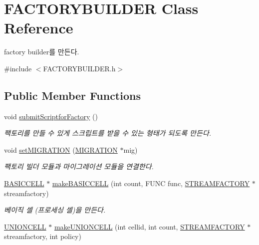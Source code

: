 \hypertarget{classFACTORYBUILDER}{}\section{F\+A\+C\+T\+O\+R\+Y\+B\+U\+I\+L\+D\+E\+R Class Reference}
\label{classFACTORYBUILDER}


factory builder를 만든다.  




{\ttfamily \#include $<$F\+A\+C\+T\+O\+R\+Y\+B\+U\+I\+L\+D\+E\+R.\+h$>$}

\subsection*{Public Member Functions}
\begin{DoxyCompactItemize}
\item 
void \hyperlink{classFACTORYBUILDER_a102e2a057446a1f767425b59983102df}{submit\+Scriptfor\+Factory} ()
\begin{DoxyCompactList}\small\item\em 팩토리를 만들 수 있게 스크립트를 받을 수 있는 형태가 되도록 만든다. \end{DoxyCompactList}\item 
void \hyperlink{classFACTORYBUILDER_aeb2912e73dafc162b3e0b7cdbc7fe943}{set\+M\+I\+G\+R\+A\+T\+I\+O\+N} (\hyperlink{classMIGRATION}{M\+I\+G\+R\+A\+T\+I\+O\+N} $\ast$mig)
\begin{DoxyCompactList}\small\item\em 팩토리 빌더 모듈과 마이그레이션 모듈을 연결한다. \end{DoxyCompactList}\item 
\hyperlink{classBASICCELL}{B\+A\+S\+I\+C\+C\+E\+L\+L} $\ast$ \hyperlink{classFACTORYBUILDER_ad29f6bcb828945d37bee154b247ded10}{make\+B\+A\+S\+I\+C\+C\+E\+L\+L} (int count, F\+U\+N\+C func, \hyperlink{classSTREAMFACTORY}{S\+T\+R\+E\+A\+M\+F\+A\+C\+T\+O\+R\+Y} $\ast$streamfactory)
\begin{DoxyCompactList}\small\item\em 베이직 셀 (프로세싱 셀)을 만든다. \end{DoxyCompactList}\item 
\hyperlink{classUNIONCELL}{U\+N\+I\+O\+N\+C\+E\+L\+L} $\ast$ \hyperlink{classFACTORYBUILDER_a485976fa00bdee0a822ef949c3db31e0}{make\+U\+N\+I\+O\+N\+C\+E\+L\+L} (int cellid, int count, \hyperlink{classSTREAMFACTORY}{S\+T\+R\+E\+A\+M\+F\+A\+C\+T\+O\+R\+Y} $\ast$streamfactory, int policy)

\end{DoxyCompactItemize}
